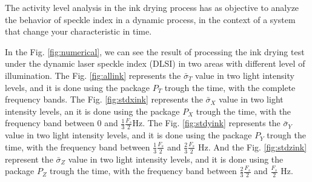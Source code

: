 \documentclass[review]{elsarticle}
\begin{document}
The activity level analysis in the ink drying process has as objective to analyze 
the behavior of speckle index in a  dynamic process,
in the context of a system that change your characteristic in time. 

In the Fig. \ref{fig:numerical}, we can see the result of processing 
 the ink drying test under the dynamic laser speckle index (DLSI) in two areas with 
different level of illumination. The Fig. \ref{fig:allink}
represents the $\bar{\sigma}_T$ value in two light intensity levels, and it is done using the package $P_T$
trough the time, with the complete frequency bands.
The Fig. \ref{fig:stdxink}
represents the $\bar{\sigma}_X$ value in two light intensity levels, an it is done using the package $P_X$
trough the time, with the frequency band between $0$ and $\frac{1}{3}\frac{F_s}{2}$Hz.
The Fig. \ref{fig:stdyink}
represents the $\bar{\sigma}_Y$ value in two light intensity levels, and it is done using the package $P_Y$
trough the time, with the frequency band between $\frac{1}{3}\frac{F_s}{2}$ and $\frac{2}{3}\frac{F_s}{2}$ Hz.
And the Fig. \ref{fig:stdzink}
represent the $\bar{\sigma}_Z$ value in two light intensity levels, and it is done using the package $P_Z$
trough the time, with the frequency band between $\frac{2}{3}\frac{F_s}{2}$ and $\frac{F_s}{2}$ Hz.
\end{document}
